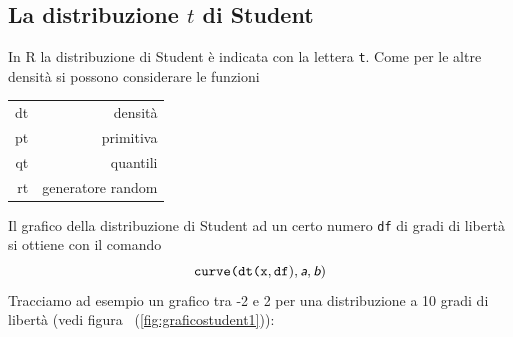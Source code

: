 \documentclass[onecolumn,12pt]{book}
\newcommand{\varia}[1]{\textsl{\textsf{#1}}}
\begin{document}
\subsection{La distribuzione $t$ di Student}
In \textsf{R} la distribuzione di Student \`e indicata con la lettera  \texttt{t}.  Come per le altre densit\`a  si possono considerare le funzioni\vskip5pt
\begin{tabular}{|r|r |}
\hline
dt  &densit\`a\\
pt  &primitiva\\
qt & quantili\\
rt  &generatore random\\
\hline
\end{tabular}
\vskip10pt
Il grafico della distribuzione di Student ad un certo numero \texttt{df} di gradi di libert\`a  si ottiene con il comando
\begin{equation*}
\texttt{curve(dt(x},\texttt{df}),\varia{a},\varia{b})
\end{equation*}
Tracciamo ad esempio un grafico tra -2 e 2 per una distribuzione a 10 gradi di libert\`a (vedi figura ~(\ref{fig:graficostudent1})):
\end{document}

